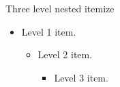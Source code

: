 \documentclass[14pt,t]{beamer-accessibility}
\begin{document}
\begin{frame}{Three level nested itemize}
\begin{itemize}
\item Level 1 item.
  \begin{itemize}
  \item Level 2 item.
    \begin{itemize}
    \item Level 3 item.
    \end{itemize}
  \end{itemize}
\end{itemize}
\end{frame}
\end{document}
